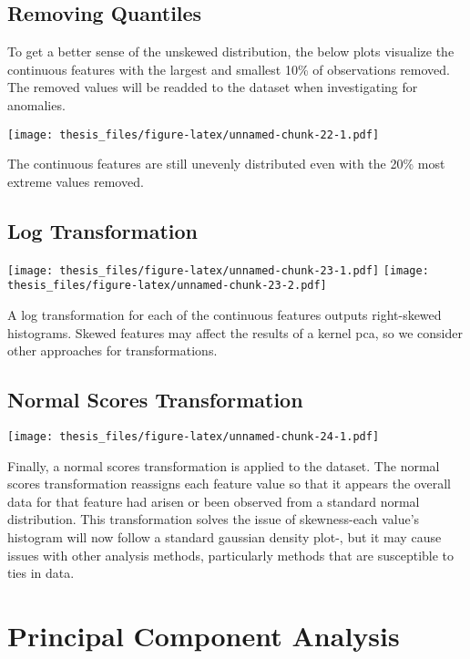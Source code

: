 \documentclass[12pt,twoside]{dukestatscithesis}
\theoremstyle{definition}
\theoremstyle{definition}
\theoremstyle{definition}
\theoremstyle{remark}
\begin{document}
\subsection{Removing Quantiles}\label{removing-quantiles}

To get a better sense of the unskewed distribution, the below plots
visualize the continuous features with the largest and smallest 10\% of
observations removed. The removed values will be readded to the dataset
when investigating for anomalies.

\texttt{[image: thesis\_files/figure-latex/unnamed-chunk-22-1.pdf]}

The continuous features are still unevenly distributed even with the
20\% most extreme values removed.

\subsection{Log Transformation}\label{log-transformation}

\texttt{[image: thesis\_files/figure-latex/unnamed-chunk-23-1.pdf]}
\texttt{[image: thesis\_files/figure-latex/unnamed-chunk-23-2.pdf]}

A log transformation for each of the continuous features outputs
right-skewed histograms. Skewed features may affect the results of a
kernel pca, so we consider other approaches for transformations.

\subsection{Normal Scores
Transformation}\label{normal-scores-transformation}

\texttt{[image: thesis\_files/figure-latex/unnamed-chunk-24-1.pdf]}

Finally, a normal scores transformation is applied to the dataset. The
normal scores transformation reassigns each feature value so that it
appears the overall data for that feature had arisen or been observed
from a standard normal distribution. This transformation solves the
issue of skewness-each value's histogram will now follow a standard
gaussian density plot-, but it may cause issues with other analysis
methods, particularly methods that are susceptible to ties in data.

\section{Principal Component
Analysis}\label{principal-component-analysis}
\end{document}

